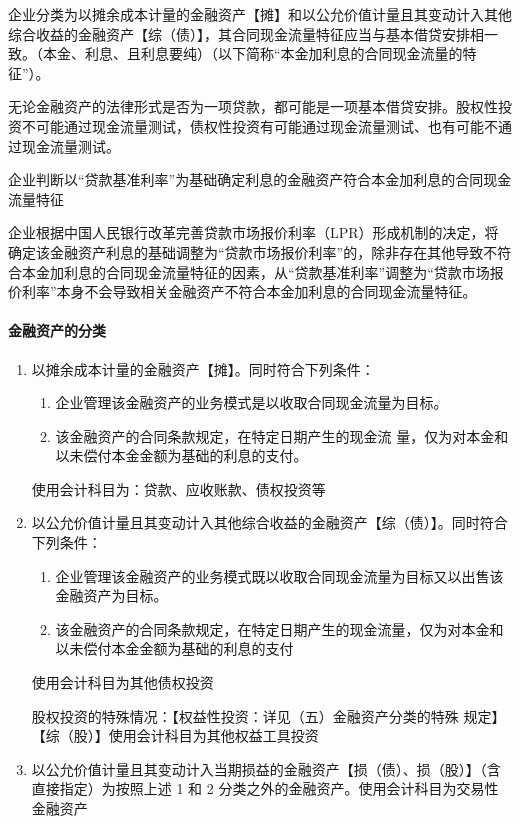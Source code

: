 \documentclass[UTF8,12pt]{ctexart}
\numberwithin{equation}{section} %
\numberwithin{figure}{section}
\numberwithin{table}{section}
\begin{document}
	企业分类为以摊余成本计量的金融资产【摊】和以公允价值计量且其变动计入其他综合收益的金融资产【综（债）】，其合同现金流量特征应当与基本借贷安排相一致。（本金、利息、且利息要纯）（以下简称“本金加利息的合同现金流量的特征”）。
	
	无论金融资产的法律形式是否为一项贷款，都可能是一项基本借贷安排。股权性投资不可能通过现金流量测试，债权性投资有可能通过现金流量测试、也有可能不通过现金流量测试。
	
	企业判断以“贷款基准利率”为基础确定利息的金融资产符合本金加利息的合同现金流量特征
	
	企业根据中国人民银行改革完善贷款市场报价利率（LPR）形成机制的决定，将确定该金融资产利息的基础调整为“贷款市场报价利率”的，除非存在其他导致不符合本金加利息的合同现金流量特征的因素，从“贷款基准利率”调整为“贷款市场报价利率”本身不会导致相关金融资产不符合本金加利息的合同现金流量特征。
	
	\paragraph{金融资产的分类}
	
	\begin{enumerate}
		\item 以摊余成本计量的金融资产【摊】。同时符合下列条件：
		\begin{enumerate}
			\item 企业管理该金融资产的业务模式是以收取合同现金流量为目标。
			
			\item 该金融资产的合同条款规定，在特定日期产生的现金流 量，仅为对本金和以未偿付本金金额为基础的利息的支付。
		\end{enumerate}
	
		使用会计科目为：贷款、应收账款、债权投资等
		
		\item 以公允价值计量且其变动计入其他综合收益的金融资产【综（债）】。同时符合下列条件：
		\begin{enumerate}
			\item 企业管理该金融资产的业务模式既以收取合同现金流量为目标又以出售该金融资产为目标。
			
			\item 该金融资产的合同条款规定，在特定日期产生的现金流量，仅为对本金和以未偿付本金金额为基础的利息的支付
		\end{enumerate}
	
		使用会计科目为其他债权投资
		
		股权投资的特殊情况：【权益性投资：详见（五）金融资产分类的特殊
		规定】【综（股）】使用会计科目为其他权益工具投资
		
		\item 以公允价值计量且其变动计入当期损益的金融资产【损（债）、损（股）】（含直接指定）为按照上述 1 和 2 分类之外的金融资产。使用会计科目为交易性金融资产
		
		
	\end{enumerate}
\end{document}
